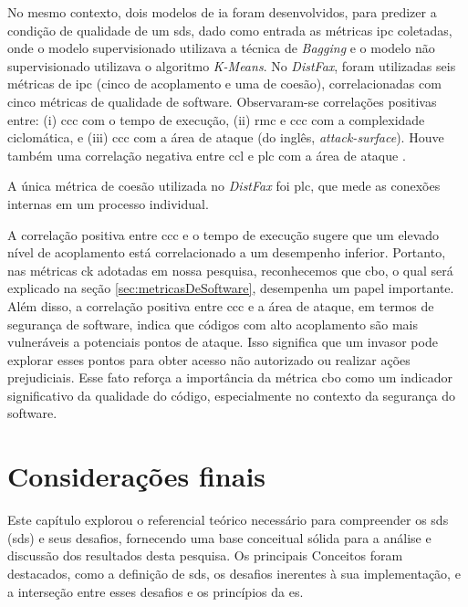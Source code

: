 No mesmo contexto, dois modelos de \gls{ia} foram desenvolvidos, para predizer a condição de qualidade de um \gls{sds}, dado como entrada as métricas \gls{ipc} coletadas, onde o modelo supervisionado utilizava a técnica de \textit{Bagging} e o modelo não supervisionado utilizava o algoritmo \textit{K-Means}. No \textit{DistFax}, foram utilizadas seis métricas de \gls{ipc} (cinco de acoplamento e uma de coesão), correlacionadas com cinco métricas de qualidade de software. Observaram-se correlações positivas entre: (i) \gls{ccc} com o tempo de execução, (ii) \gls{rmc} e \gls{ccc} com a complexidade ciclomática, e (iii) \gls{ccc} com a área de ataque (do inglês, \textit{attack-surface}). Houve também uma correlação negativa entre \gls{ccl} e \gls{plc} com a área de ataque \cite{DistFax}.

A única métrica de coesão utilizada no \textit{DistFax} foi \gls{plc}, que mede as conexões internas em um processo individual.

A correlação positiva entre \gls{ccc} e o tempo de execução sugere que um elevado nível de acoplamento está correlacionado a um desempenho inferior. Portanto, nas métricas \gls{ck} adotadas em nossa pesquisa, reconhecemos que \gls{cbo}, o qual será explicado na seção \ref{sec:metricasDeSoftware}, desempenha um papel importante. Além disso, a correlação positiva entre \gls{ccc} e a área de ataque, em termos de segurança de software, indica que códigos com alto acoplamento são mais vulneráveis a potenciais pontos de ataque. Isso significa que um invasor pode explorar esses pontos para obter acesso não autorizado ou realizar ações prejudiciais. Esse fato reforça a importância da métrica \gls{cbo} como um indicador significativo da qualidade do código, especialmente no contexto da segurança do software.

\section{Considerações finais}
Este capítulo explorou o referencial teórico necessário para compreender os \gls{sds} (\gls{sds}) e seus desafios, fornecendo uma base conceitual sólida para a análise e discussão dos resultados desta pesquisa. Os principais Conceitos foram destacados, como a definição de \gls{sds}, os desafios inerentes à sua implementação, e a interseção entre esses desafios e os princípios da \gls{es}.

